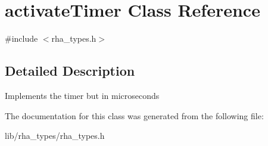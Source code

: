 \hypertarget{classactivateTimer}{}\section{activate\+Timer Class Reference}
\label{classactivateTimer}


{\ttfamily \#include $<$rha\+\_\+types.\+h$>$}



\subsection{Detailed Description}
Implements the timer but in microseconds 

The documentation for this class was generated from the following file\+:\begin{DoxyCompactItemize}
\item 
lib/rha\+\_\+types/rha\+\_\+types.\+h\end{DoxyCompactItemize}

